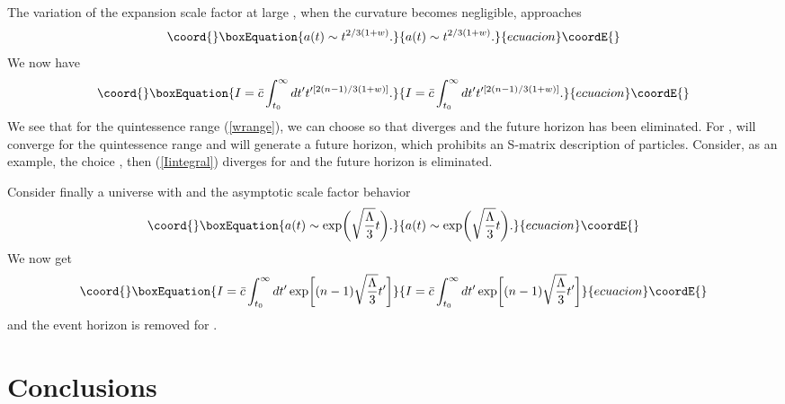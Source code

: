 \documentclass[a4paper,12pt]{article}
\begin{document}
The variation of the expansion scale factor at large \coordHE{}, when the
curvature becomes negligible, approaches
\begin{equation}\coord{}\boxEquation{
a(t)\sim t^{2/3(1+w)}.
}{
a(t)\sim t^{2/3(1+w)}.
}{ecuacion}\coordE{}\end{equation}
We now have
\begin{equation}\coord{}\boxEquation{
\label{Iintegral}
I={\bar c}\int^\infty_{t_0}dt^\prime t^{\prime[2(n-1)/3(1+w)]}.
}{
I={\bar c}\int^\infty_{t_0}dt^\prime t^{\prime[2(n-1)/3(1+w)]}.
}{ecuacion}\coordE{}\end{equation}
We see that for the quintessence \coordHE{} range (\ref{wrange}), we can choose
\coordHE{} so that \coordHE{} diverges and the future horizon has been eliminated. For
\coordHE{}, \coordHE{} will converge for the quintessence \coordHE{} range and will generate a
future horizon, which prohibits an S-matrix description of particles.
Consider, as an example, the choice \coordHE{}, then
(\ref{Iintegral}) diverges for \coordHE{} and the future horizon
is eliminated.

Consider finally a \coordHE{} universe with \coordHE{} and the asymptotic
scale factor behavior
\begin{equation}\coord{}\boxEquation{
a(t)\sim\exp\biggl(\sqrt{\frac{\Lambda}{3}}t\biggr).
}{
a(t)\sim\exp\biggl(\sqrt{\frac{\Lambda}{3}}t\biggr).
}{ecuacion}\coordE{}\end{equation}
We now get
\begin{equation}\coord{}\boxEquation{
I={\bar c}\int_{t_0}^\infty
dt^\prime\exp\biggl[(n-1)\sqrt{\frac{\Lambda}{3}}t^\prime\biggr]
}{
I={\bar c}\int_{t_0}^\infty
dt^\prime\exp\biggl[(n-1)\sqrt{\frac{\Lambda}{3}}t^\prime\biggr]
}{ecuacion}\coordE{}\end{equation}
and the \coordHE{} event horizon is removed for \coordHE{}.

\section{\bf Conclusions}
\end{document}
